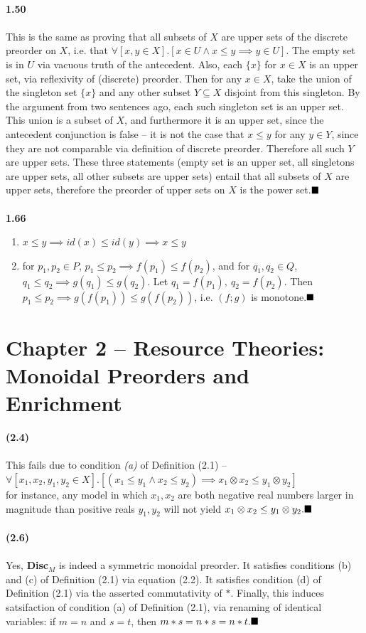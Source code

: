 \documentclass{article}
\begin{document}
 \\
\textbf{1.50}\\
 \\
This is the same as proving that all subsets of $X$ are upper sets of the discrete preorder on $X$, i.e. that $\forall \left[x,y\in X\right].\left[ x\in U \wedge x\leq y \implies y\in U \right]$. The empty set is in $U$ via vacuous truth of the antecedent. Also, each $\{ x\}$ for $x\in X$ is an upper set, via reflexivity of (discrete) preorder. Then for any $x\in X$, take the union of the singleton set $\{ x \}$ and any other subset $Y\subseteq X$ disjoint from this singleton. By the argument from two sentences ago, each such singleton set is an upper set. This union is a subset of $X$, and furthermore it is an upper set, since the antecedent conjunction is false – it is not the case that $x\leq y$ for any $y\in Y$, since they are not comparable via definition of discrete preorder. Therefore all such $Y$ are upper sets. These three statements (empty set is an upper set, all singletons are upper sets, all other subsets are upper sets) entail that all subsets of $X$ are upper sets, therefore the preorder of upper sets on $X$ is the power set.$\hfill\blacksquare$\\
 \\
\textbf{1.66}\bigskip
\begin{enumerate}
	\item $x\leq y\implies id(x)\leq id(y)\implies x\leq y$
	\item for $p_1,p_2\in P$, $p_1\leq p_2 \implies f(p_1)\leq f(p_2)$, and for $q_1,q_2\in Q$, $q_1\leq q_2 \implies g(q_1)\leq g(q_2)$. Let $q_1=f(p_1), \ q_2=f(p_2)$. Then $p_1\leq p_2\implies g(f(p_1))\leq g(f(p_2))$, i.e. $(f;g)$ is monotone.$\hfill\blacksquare$
\end{enumerate}
\section{Chapter 2 – Resource Theories: Monoidal Preorders and Enrichment}
\textbf{(2.4)}\\
 \\
This fails due to condition \textit{(a)} of Definition (2.1) –\\ 
$\forall \left[ x_1,x_2,y_1,y_2 \in X\right] .\left[ (x_1\leq y_1 \wedge x_2\leq y_2)\implies x_1\otimes x_2 \leq y_1 \otimes y_2 \right] $\\
for instance, any model in which $x_1,x_2$ are both negative real numbers larger in magnitude than positive reals $y_1,y_2$ will not yield $x_1\otimes x_2 \leq y_1\otimes y_2.\hfill\blacksquare$\\
 \\
\textbf{(2.6)}\\
 \\
Yes, \textbf{Disc}$_M$ is indeed a symmetric monoidal preorder. It satisfies conditions (b) and (c) of Definition (2.1) via equation (2.2). It satisfies condition (d) of Definition (2.1) via the asserted commutativity of $*$. Finally, this induces satsifaction of condition (a) of Definition (2.1), via renaming of identical variables: if $m=n$ and $s=t$, then $m*s=n*s=n*t.\hfill\blacksquare$
\end{document}
